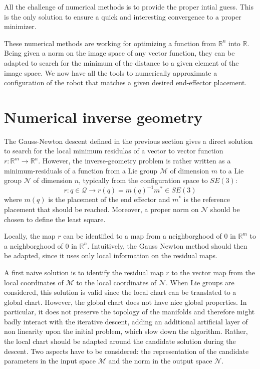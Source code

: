 \documentclass{book}
\begin{document}
All the challenge of numerical methods is to provide the proper intial guess. This is the only solution to ensure a quick and interesting convergence to a proper minimizer.

These numerical methods are working for optimizing a function from $\mathbb{R}^n$ into $\mathbb{R}$. Being given a norm on the image space of any vector function, they can be adapted to search for the minimum of the distance to a given element of the image space. 
We now have all the tools to numerically approximate a configuration of the robot that matches a given desired end-effector placement.



\chapter{Numerical inverse geometry}\label{sec:numinvgeom}

The Gauss-Newton descent defined in the previous section gives a direct solution to search for the local minimum residulas of a vector to vector function $r: \mathbb{R}^m \rightarrow \mathbb{R}^n$. However, the inverse-geometry problem is rather written as a minimum-residuals of a function from a Lie group $\mathcal{M}$ of dimension $m$ to a Lie group $\mathcal{N}$ of dimension $n$, typically from the configuration space to $SE(3)$: 
$$ r: q \in \mathcal{Q} \rightarrow r(q) =  m(q)^{-1} m^*  \in SE(3) $$
where $m(q)$ is the placement of the end effector and $m^*$ is the reference placement that should be reached. Moreover, a proper norm on $\mathcal{N}$ should be chosen to define the least square.

Locally, the map $r$ can be identified to a map from a neighborghood of 0 in $\mathbb{R}^m$ to a neighborghood of 0 in $\mathbb{R}^n$. Intuitively, the Gauss Newton method should then be adapted, since it uses only local information on the residual maps. 

A first naive solution is to identify the residual map $r$ to the vector map from the local coordinates of $\mathcal{M}$ to the local coordinates of $\mathcal{N}$. When Lie groups are considered, this solution is valid since the local chart can be translated to a global chart. However, the global chart does not have nice global properties. In particular, it does not preserve the topology of the manifolds and therefore might badly interact with the iterative descent, adding an additional artificial layer of non linearity upon the initial problem, which slow down the algorithm. Rather, the local chart should be adapted around the candidate solution during the descent. Two aspects have to be considered: the representation of the candidate parameters in the input space $\mathcal{M}$ and the norm in the output space $\mathcal{N}$.
\end{document}
